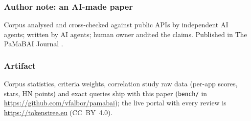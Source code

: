 \documentclass[10pt]{article}
\begin{document}
\subsubsection*{Author note: an AI-made paper}
Corpus analysed and cross-checked against public APIs by independent AI agents; written by AI agents; human owner audited the claims. Published in The PaMaBAI Journal \citep{pamabai2026}.

\subsubsection*{Artifact}
Corpus statistics, criteria weights, correlation study raw data (per-app scores, stars, HN points) and exact queries ship with this paper (\texttt{bench/} in \url{https://github.com/vfalbor/pamabai}); the live portal with every review is \url{https://tokenstree.eu} (CC~BY~4.0).



\end{document}
